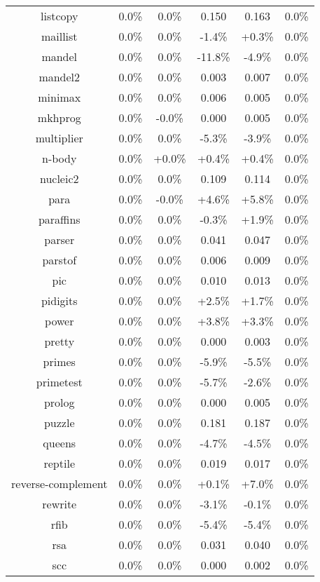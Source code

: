 \begin{tabular}{ c c c c c c }
listcopy &  0.0\% &  0.0\% & 0.150 & 0.163 &  0.0\%\\
maillist &  0.0\% &  0.0\% & -1.4\% & +0.3\% &  0.0\%\\
mandel &  0.0\% &  0.0\% & -11.8\% & -4.9\% &  0.0\%\\
mandel2 &  0.0\% &  0.0\% & 0.003 & 0.007 &  0.0\%\\
minimax &  0.0\% &  0.0\% & 0.006 & 0.005 &  0.0\%\\
mkhprog &  0.0\% & -0.0\% & 0.000 & 0.005 &  0.0\%\\
multiplier &  0.0\% &  0.0\% & -5.3\% & -3.9\% &  0.0\%\\
n-body &  0.0\% & +0.0\% & +0.4\% & +0.4\% &  0.0\%\\
nucleic2 &  0.0\% &  0.0\% & 0.109 & 0.114 &  0.0\%\\
para &  0.0\% & -0.0\% & +4.6\% & +5.8\% &  0.0\%\\
paraffins &  0.0\% &  0.0\% & -0.3\% & +1.9\% &  0.0\%\\
parser &  0.0\% &  0.0\% & 0.041 & 0.047 &  0.0\%\\
parstof &  0.0\% &  0.0\% & 0.006 & 0.009 &  0.0\%\\
pic &  0.0\% &  0.0\% & 0.010 & 0.013 &  0.0\%\\
pidigits &  0.0\% &  0.0\% & +2.5\% & +1.7\% &  0.0\%\\
power &  0.0\% &  0.0\% & +3.8\% & +3.3\% &  0.0\%\\
pretty &  0.0\% &  0.0\% & 0.000 & 0.003 &  0.0\%\\
primes &  0.0\% &  0.0\% & -5.9\% & -5.5\% &  0.0\%\\
primetest &  0.0\% &  0.0\% & -5.7\% & -2.6\% &  0.0\%\\
prolog &  0.0\% &  0.0\% & 0.000 & 0.005 &  0.0\%\\
puzzle &  0.0\% &  0.0\% & 0.181 & 0.187 &  0.0\%\\
queens &  0.0\% &  0.0\% & -4.7\% & -4.5\% &  0.0\%\\
reptile &  0.0\% &  0.0\% & 0.019 & 0.017 &  0.0\%\\
reverse-complement &  0.0\% &  0.0\% & +0.1\% & +7.0\% &  0.0\%\\
rewrite &  0.0\% &  0.0\% & -3.1\% & -0.1\% &  0.0\%\\
rfib &  0.0\% &  0.0\% & -5.4\% & -5.4\% &  0.0\%\\
rsa &  0.0\% &  0.0\% & 0.031 & 0.040 &  0.0\%\\
scc &  0.0\% &  0.0\% & 0.000 & 0.002 &  0.0\%\\

\end{tabular}
